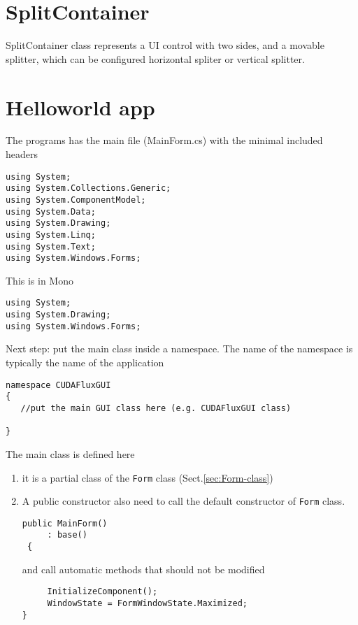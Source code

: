 \section{SplitContainer}

SplitContainer class represents a UI control with two sides, and a movable
splitter, which can be configured horizontal spliter or vertical splitter.


\section{Helloworld app}


The programs has the main file (MainForm.cs) with the minimal included headers
\begin{Verbatim}
using System;
using System.Collections.Generic;
using System.ComponentModel;
using System.Data;
using System.Drawing;
using System.Linq;
using System.Text;
using System.Windows.Forms;
\end{Verbatim}

\begin{mdframed}
This is in Mono

\begin{verbatim}
using System;
using System.Drawing;
using System.Windows.Forms;
\end{verbatim}

\end{mdframed}

Next step: put the main class inside a namespace. The name of the namespace is
typically the name of the application
\begin{Verbatim}
namespace CUDAFluxGUI
{
   //put the main GUI class here (e.g. CUDAFluxGUI class)

}
\end{Verbatim}

The main class is defined here
\begin{enumerate}
  \item it is a partial class of the \verb!Form! class
  (Sect.\ref{sec:Form-class})
  \item A public constructor also need to call the default constructor of
  \verb!Form! class.
  
\begin{Verbatim}
public MainForm()
     : base()
 {
\end{Verbatim}
   and call automatic methods that should not be modified
\begin{verbatim}
     InitializeComponent();
     WindowState = FormWindowState.Maximized;     
}
\end{verbatim}


\end{enumerate}

